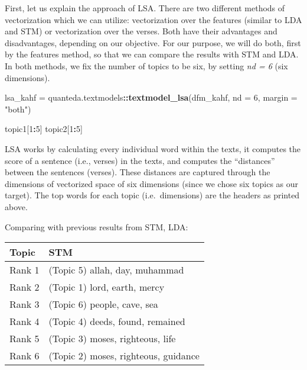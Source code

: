 \documentclass[
]{article}
\newenvironment{Shaded}{\begin{snugshade}}{\end{snugshade}}
\newcommand{\AttributeTok}[1]{\textcolor[rgb]{0.13,0.29,0.53}{#1}}
\newcommand{\DecValTok}[1]{\textcolor[rgb]{0.00,0.00,0.81}{#1}}
\newcommand{\FunctionTok}[1]{\textcolor[rgb]{0.13,0.29,0.53}{\textbf{#1}}}
\newcommand{\NormalTok}[1]{#1}
\newcommand{\OtherTok}[1]{\textcolor[rgb]{0.56,0.35,0.01}{#1}}
\newcommand{\SpecialCharTok}[1]{\textcolor[rgb]{0.81,0.36,0.00}{\textbf{#1}}}
\newcommand{\StringTok}[1]{\textcolor[rgb]{0.31,0.60,0.02}{#1}}
\begin{document}
First, let us explain the approach of LSA. There are two different methods of vectorization which we can utilize: vectorization over the features (similar to LDA and STM) or vectorization over the verses. Both have their advantages and disadvantages, depending on our objective. For our purpose, we will do both, first by the features method, so that we can compare the results with STM and LDA. In both methods, we fix the number of topics to be six, by setting \emph{nd = 6} (six dimensions).

\footnotesize

\begin{Shaded}
\begin{Highlighting}[]
\NormalTok{lsa\_kahf }\OtherTok{=}\NormalTok{ quanteda.textmodels}\SpecialCharTok{::}\FunctionTok{textmodel\_lsa}\NormalTok{(dfm\_kahf, }\AttributeTok{nd =} \DecValTok{6}\NormalTok{, }\AttributeTok{margin =} \StringTok{"both"}\NormalTok{)}
\end{Highlighting}
\end{Shaded}

\begin{Shaded}
\begin{Highlighting}[]
\NormalTok{topic1[}\DecValTok{1}\SpecialCharTok{:}\DecValTok{5}\NormalTok{]}
\NormalTok{topic2[}\DecValTok{1}\SpecialCharTok{:}\DecValTok{5}\NormalTok{]}
\end{Highlighting}
\end{Shaded}

\normalsize

LSA works by calculating every individual word within the texts, it computes the score of a sentence (i.e., verses) in the texts, and computes the ``distances'' between the sentences (verses). These distances are captured through the dimensions of vectorized space of six dimensions (since we chose six topics as our target). The top words for each topic (i.e.~dimensions) are the headers as printed above.

Comparing with previous results from STM, LDA:

\begin{longtable}[]{@{}ll@{}}
\toprule\noalign{}
Topic & STM \\
\midrule\noalign{}
\endhead
\bottomrule\noalign{}
\endlastfoot
Rank 1 & (Topic 5) allah, day, muhammad \\
Rank 2 & (Topic 1) lord, earth, mercy \\
Rank 3 & (Topic 6) people, cave, sea \\
Rank 4 & (Topic 4) deeds, found, remained \\
Rank 5 & (Topic 3) moses, righteous, life \\
Rank 6 & (Topic 2) moses, righteous, guidance \\
\end{longtable}
\end{document}
